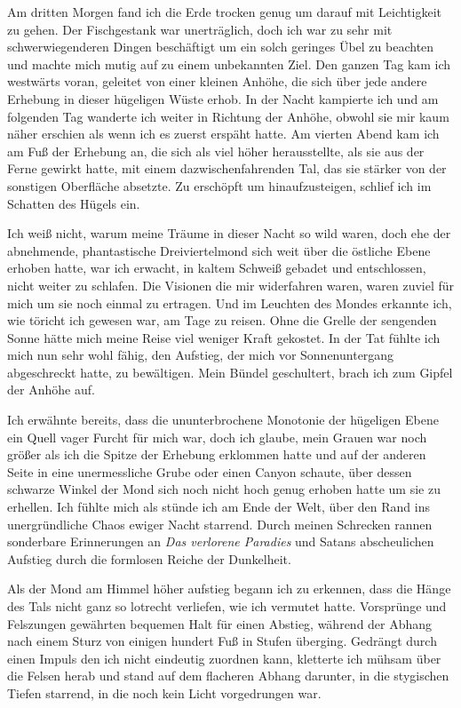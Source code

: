 \documentclass[a4paper]{memoir}
\begin{document}
Am dritten Morgen fand ich die Erde trocken genug um darauf mit Leichtigkeit zu gehen. Der Fischgestank war unerträglich, doch ich war zu sehr mit schwerwiegenderen Dingen beschäftigt um ein solch geringes Übel zu beachten und machte mich mutig auf zu einem unbekannten Ziel. Den ganzen Tag kam ich westwärts voran, geleitet von einer kleinen Anhöhe, die sich über jede andere Erhebung in dieser hügeligen Wüste erhob. In der Nacht kampierte ich und am folgenden Tag wanderte ich weiter in Richtung der Anhöhe, obwohl sie mir kaum näher erschien als wenn ich es zuerst erspäht hatte. Am vierten Abend kam ich am Fuß der Erhebung an, die sich als viel höher herausstellte, als sie aus der Ferne gewirkt hatte, mit einem dazwischenfahrenden Tal, das sie stärker von der sonstigen Oberfläche absetzte. Zu erschöpft um hinaufzusteigen, schlief ich im Schatten des Hügels ein.

Ich weiß nicht, warum meine Träume in dieser Nacht so wild waren, doch ehe der abnehmende, phantastische Dreiviertelmond sich weit über die östliche Ebene erhoben hatte, war ich erwacht, in kaltem Schweiß gebadet und entschlossen, nicht weiter zu schlafen. Die Visionen die mir widerfahren waren, waren zuviel für mich um sie noch einmal zu ertragen. Und im Leuchten des Mondes erkannte ich, wie töricht ich gewesen war, am Tage zu reisen. Ohne die Grelle der sengenden Sonne hätte mich meine Reise viel weniger Kraft gekostet. In der Tat fühlte ich mich nun sehr wohl fähig, den Aufstieg, der mich vor Sonnenuntergang abgeschreckt hatte, zu bewältigen. Mein Bündel geschultert, brach ich zum Gipfel der Anhöhe auf.

Ich erwähnte bereits, dass die ununterbrochene Monotonie der hügeligen Ebene ein Quell vager Furcht für mich war, doch ich glaube, mein Grauen war noch größer als ich die Spitze der Erhebung erklommen hatte und auf der anderen Seite in eine unermessliche Grube oder einen Canyon schaute, über dessen schwarze Winkel der Mond sich noch nicht hoch genug erhoben hatte um sie zu erhellen. Ich fühlte mich als stünde ich am Ende der Welt, über den Rand ins unergründliche Chaos ewiger Nacht starrend. Durch meinen Schrecken rannen sonderbare Erinnerungen an \textit{Das verlorene Paradies} und Satans abscheulichen Aufstieg durch die formlosen Reiche der Dunkelheit.

Als der Mond am Himmel höher aufstieg begann ich zu erkennen, dass die Hänge des Tals nicht ganz so lotrecht verliefen, wie ich vermutet hatte. Vorsprünge und Felszungen gewährten bequemen Halt für einen Abstieg, während der Abhang nach einem Sturz von einigen hundert Fuß in Stufen überging. Gedrängt durch einen Impuls den ich nicht eindeutig zuordnen kann, kletterte ich mühsam über die Felsen herab und stand auf dem flacheren Abhang darunter, in die stygischen Tiefen starrend, in die noch kein Licht vorgedrungen war.
\end{document}
